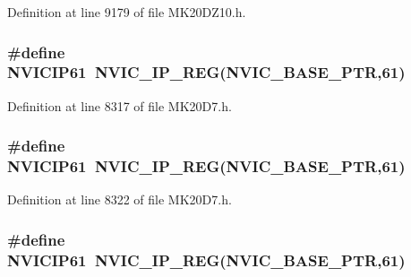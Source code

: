 Definition at line 9179 of file M\+K20\+D\+Z10.\+h.

\subsubsection[{\texorpdfstring{N\+V\+I\+C\+I\+P61}{NVICIP61}}]{\setlength{\rightskip}{0pt plus 5cm}\#define N\+V\+I\+C\+I\+P61~{\bf N\+V\+I\+C\+\_\+\+I\+P\+\_\+\+R\+EG}({\bf N\+V\+I\+C\+\_\+\+B\+A\+S\+E\+\_\+\+P\+TR},61)}\hypertarget{group___n_v_i_c___register___accessor___macros_ga722ecc36d71a87ef8b007e1912862f73}{}\label{group___n_v_i_c___register___accessor___macros_ga722ecc36d71a87ef8b007e1912862f73}


Definition at line 8317 of file M\+K20\+D7.\+h.

\subsubsection[{\texorpdfstring{N\+V\+I\+C\+I\+P61}{NVICIP61}}]{\setlength{\rightskip}{0pt plus 5cm}\#define N\+V\+I\+C\+I\+P61~{\bf N\+V\+I\+C\+\_\+\+I\+P\+\_\+\+R\+EG}({\bf N\+V\+I\+C\+\_\+\+B\+A\+S\+E\+\_\+\+P\+TR},61)}\hypertarget{group___n_v_i_c___register___accessor___macros_ga722ecc36d71a87ef8b007e1912862f73}{}\label{group___n_v_i_c___register___accessor___macros_ga722ecc36d71a87ef8b007e1912862f73}


Definition at line 8322 of file M\+K20\+D7.\+h.

\subsubsection[{\texorpdfstring{N\+V\+I\+C\+I\+P61}{NVICIP61}}]{\setlength{\rightskip}{0pt plus 5cm}\#define N\+V\+I\+C\+I\+P61~{\bf N\+V\+I\+C\+\_\+\+I\+P\+\_\+\+R\+EG}({\bf N\+V\+I\+C\+\_\+\+B\+A\+S\+E\+\_\+\+P\+TR},61)}\hypertarget{group___n_v_i_c___register___accessor___macros_ga722ecc36d71a87ef8b007e1912862f73}{}\label{group___n_v_i_c___register___accessor___macros_ga722ecc36d71a87ef8b007e1912862f73}


